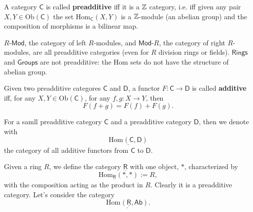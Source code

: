 \begin{defn}
	A category $\mathsf{C}$ is called \textbf{preadditive} iff it is a $\mathbb{Z}$ category, i.e. iff
	given any pair $X,Y \in \mathrm{Ob} \left(\mathsf{C}\right)$ the set $\mathrm{Hom}_{\mathsf{C}} \left( X, Y \right)$ is a $\mathbb{Z}$-module (an abelian group) and the composition of morphisms is a bilinear map.
\end{defn}

\begin{ex}
	$R\text{-}\mathsf{Mod}$, the category of left $R$-modules, and $\mathsf{Mod}\text{-}R$, the category of right $R$-modules, are all preadditive categories (even for $R$ division rings or fields).\newline
	$\mathsf{Rings}$ and $\mathsf{Groups}$ are not preadditive: the Hom sets do not have the structure of abelian group.
\end{ex} 

\begin{defn}
	Given two preadditive categores $\mathsf{C}$ and $\mathsf{D}$, a functor $F: \mathsf{C} \to \mathsf{D}$ is called \textbf{additive} iff, for any $X,Y \in \mathrm{Ob} \left(\mathsf{C}\right)$, for any $f,g: X \to Y$, then
	\begin{equation}
		F(f+g) = F(f) + F(g)
	.\end{equation} 
\end{defn}

\begin{rem}
	For a samll preadditive category $\mathsf{C}$ and a preadditive category $\mathsf{D}$, then we denote with
	\begin{equation}
		\underline{\mathrm{Hom}_{} \left( \mathsf{C}, \mathsf{D} \right)}
	\end{equation} 
	the category of all additive functors from $\mathsf{C}$ to $\mathsf{D}$.
\end{rem}

\begin{ex}
	Given a ring $R$, we define the category $\underline{\mathsf{R}}$ with one object, $*$, characterized by
	\begin{equation}
		\mathrm{Hom}_{\underline{\mathsf{R}}} \left(* , * \right) := R
	,\end{equation} 
	with the composition acting as the product in $R$.
	Clearly it is a preadditive category.
	Let's consider the category
	\begin{equation}
		\underline{\mathrm{Hom}_{} \left( \underline{\mathsf{R}}, \mathsf{Ab} \right)}
	.\end{equation} 
\end{ex}

